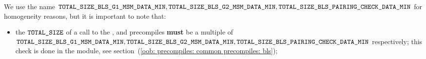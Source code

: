 \saNote{} We use the name $\texttt{TOTAL\_SIZE\_BLS\_G1\_MSM\_DATA\_MIN}, \texttt{TOTAL\_SIZE\_BLS\_G2\_MSM\_DATA\_MIN}, \texttt{TOTAL\_SIZE\_BLS\_PAIRING\_CHECK\_DATA\_MIN}$ for homogeneity reasons, but it is important to note that:
\begin{itemize}
    \item
        the $\texttt{TOTAL\_SIZE}$ of a call to the ,  and  precompiles \textbf{must} be a multiple of $\texttt{TOTAL\_SIZE\_BLS\_G1\_MSM\_DATA\_MIN}, \texttt{TOTAL\_SIZE\_BLS\_G2\_MSM\_DATA\_MIN}, \texttt{TOTAL\_SIZE\_BLS\_PAIRING\_CHECK\_DATA\_MIN}$ respectively;
        this check is done in the \oobMod{} module, see
        section~(\ref{oob: precompiles: common precompiles: bls}); 
\end{itemize}
